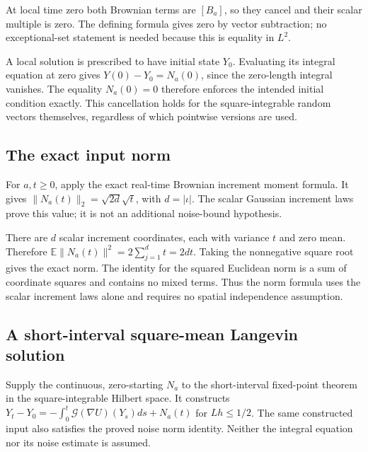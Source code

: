 \documentclass[11pt,a4paper]{report}
\begin{document}
At local time zero both Brownian terms are \([B_a]\), so they cancel and their scalar multiple is zero. The defining formula gives zero by vector subtraction; no exceptional-set statement is needed because this is equality in \(L^2\).



A local solution is prescribed to have initial state \(Y_0\). Evaluating its integral equation at zero gives \(Y(0)-Y_0=N_a(0)\), since the zero-length integral vanishes. The equality \(N_a(0)=0\) therefore enforces the intended initial condition exactly. This cancellation holds for the square-integrable random vectors themselves, regardless of which pointwise versions are used.

\subsection{\texorpdfstring{The exact input norm}{The exact input norm}}
\label{report-step-UnadjustedLangevin-BrownianLangevin-lean-4}


For \(a,t\ge0\), apply the exact real-time Brownian increment moment formula. It gives \(\|N_a(t)\|_2=\sqrt{2d}\sqrt t\), with \(d=|\iota|\). The scalar Gaussian increment laws prove this value; it is not an additional noise-bound hypothesis.



There are \(d\) scalar increment coordinates, each with variance \(t\) and zero mean. Therefore \(\mathbb E\|N_a(t)\|^2=2\sum_{j=1}^d t=2dt\). Taking the nonnegative square root gives the exact norm. The identity for the squared Euclidean norm is a sum of coordinate squares and contains no mixed terms. Thus the norm formula uses the scalar increment laws alone and requires no spatial independence assumption.

\subsection{\texorpdfstring{A short-interval square-mean Langevin solution}{A short-interval square-mean Langevin solution}}
\label{report-step-UnadjustedLangevin-BrownianLangevin-lean-5}


Supply the continuous, zero-starting \(N_a\) to the short-interval fixed-point theorem in the square-integrable Hilbert space. It constructs \(Y_t-Y_0=-\int_0^t\mathcal G(\nabla U)(Y_s)ds+N_a(t)\) for \(Lh\le1/2\). The same constructed input also satisfies the proved noise norm identity. Neither the integral equation nor its noise estimate is assumed.
\end{document}

